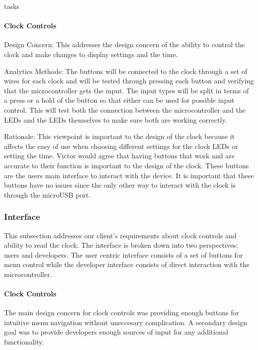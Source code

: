 tasks\documentclass[onecolumn, draftclsnofoot,10pt, compsoc]{IEEEtran}
\begin{document}
\paragraph{Clock Controls}
\vspace{2mm} Design Concern: This addresses the design concern of the ability to control the clock and make changes to display settings and the time.

\vspace{2mm} Analytics Methods: The buttons will be connected to the clock through a set of wires for each clock and will be tested through pressing each button and verifying that the microcontroller gets the input.
The input types will be split in terms of a press or a hold of the button so that either can be used for possible input control.
This will test both the connection between the microcontroller and the LEDs and the LEDs themselves to make sure both are working correctly.

\vspace{2mm} Rationale: This viewpoint is important to the design of the clock because it affects the easy of use when choosing different settings for the clock LEDs or setting the time.
Victor would agree that having buttons that work and are accurate to their function is important to the design of the clock.
These buttons are the users main interface to interact with the device.
It is important that these buttons have no issues since the only other way to interact with the clock is through the microUSB port.

\subsubsection{Interface}
This subsection addresses our client's requirements about clock controls and ability to read the clock.
The interface is broken down into two perspectives: users and developers.
The user centric interface consists of a set of buttons for menu control while the developer interface consists of direct interaction with the microcontroller.
\vspace{1mm}
\paragraph{Clock Controls}

\vspace{2mm} The main design concern for clock controls was providing enough buttons for intuitive menu navigation without uneccesary complication.
A secondary design goal was to provide developers enough sources of input for any additional functionality.
\end{document}
